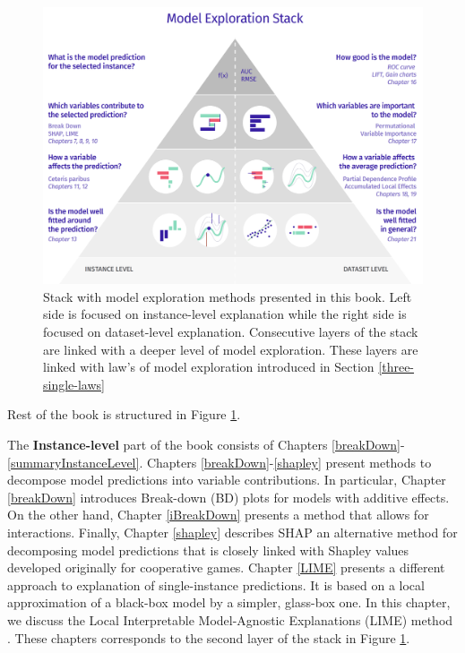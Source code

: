 \documentclass[]{krantz}
\begin{document}
\begin{figure}

{\centering \includegraphics[width=0.85\linewidth]{figure/UMEPpiramide} 

}

\caption{Stack with model exploration methods presented in this book. Left side is focused on instance-level explanation while the right side is focused on dataset-level explanation. Consecutive layers of the stack are linked with a deeper level of model exploration. These layers are linked with law's of model exploration introduced in Section \ref{three-single-laws}}\label{fig:UMEPpiramide}
\end{figure}

Rest of the book is structured in Figure \ref{fig:UMEPpiramide}.

The \textbf{Instance-level} part of the book consists of Chapters \ref{breakDown}-\ref{summaryInstanceLevel}.
Chapters \ref{breakDown}-\ref{shapley} present methods to decompose model predictions into variable contributions. In particular, Chapter \ref{breakDown} introduces Break-down (BD) plots for models with additive effects. On the other hand, Chapter \ref{iBreakDown} presents a method that allows for interactions. Finally, Chapter \ref{shapley} describes SHAP \citep{SHAP} an alternative method for decomposing model predictions that is closely linked with Shapley values \citep{shapleybook1952} developed originally for cooperative games.
Chapter \ref{LIME} presents a different approach to explanation of single-instance predictions. It is based on a local approximation of a black-box model by a simpler, glass-box one. In this chapter, we discuss the Local Interpretable Model-Agnostic Explanations (LIME) method \citep{lime}. These chapters corresponds to the second layer of the stack in Figure \ref{fig:UMEPpiramide}.
\end{document}
